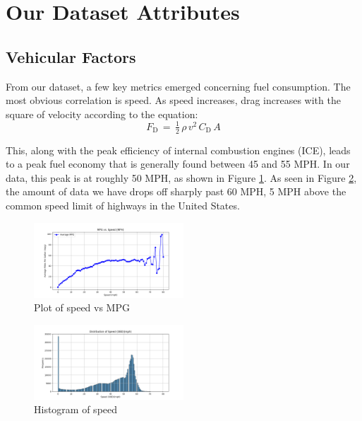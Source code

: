 \documentclass[letterpaper]{article}
\begin{document}
\section*{Our Dataset Attributes}

\subsection*{Vehicular Factors}

From our dataset, a few key metrics emerged concerning fuel consumption. 
The most obvious correlation is speed. As speed increases, drag increases 
with the square of velocity according to the equation: 
\[
    \displaystyle F_{\mathrm {D} }\,=\,{\tfrac {1}{2}}\,\rho \,v^{2}\,C_{\mathrm {D} }\,A
\] 

This, along with the peak efficiency of internal combustion engines (ICE), 
leads to a peak fuel economy that is generally found between 45 and 55 MPH. 
In our data, this peak is at roughly 50 MPH, as shown in Figure \ref{fig:mpgspeed}. 
As seen in Figure \ref{fig:histmpgspeed}, the amount of data we have drops off sharply 
past 60 MPH, 5 MPH above the common speed limit of highways in the United 
States.

\begin{figure}[htbp]
    \centering
    \includegraphics[width=0.5\textwidth]{figures/speed_vs_mpg.png}
    \caption{Plot of speed vs MPG}
    \label{fig:mpgspeed}
\end{figure}

\begin{figure}[htbp]
    \centering
    \includegraphics[width=0.5\textwidth]{figures/histogram_speedobdmph.png}
    \caption{Histogram of speed}
    \label{fig:histmpgspeed}
\end{figure}
\end{document}
